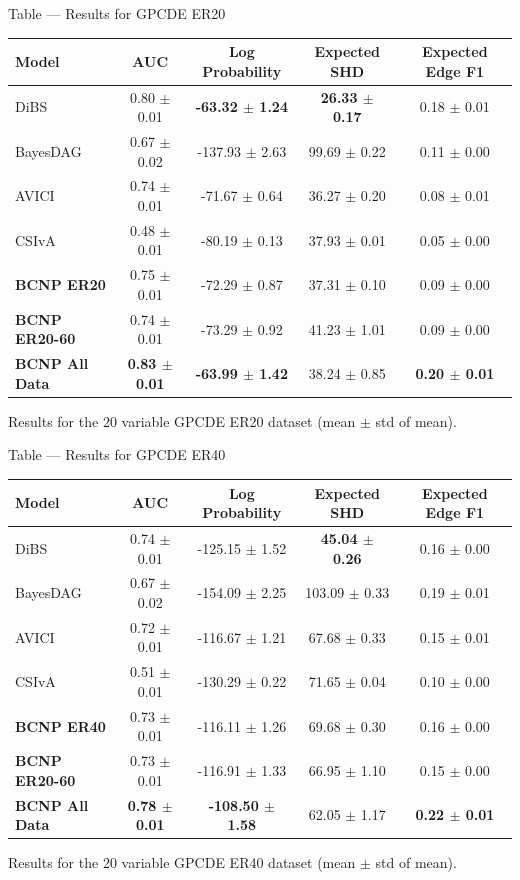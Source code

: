 \documentclass[aspectratio=169,10pt]{beamer}
\begin{document}
\begin{frame}{Table --- Results for GPCDE ER20}
\centering
\scriptsize
\begin{tabular}{lcccc}
\toprule
\textbf{Model} & \textbf{AUC} & \textbf{Log Probability} & \textbf{Expected SHD} & \textbf{Expected Edge F1} \\
\midrule
DiBS & 0.80 $\pm$ 0.01 & \textbf{-63.32 $\pm$ 1.24} & \textbf{26.33 $\pm$ 0.17} & 0.18 $\pm$ 0.01 \\
BayesDAG & 0.67 $\pm$ 0.02 & -137.93 $\pm$ 2.63 & 99.69 $\pm$ 0.22 & 0.11 $\pm$ 0.00 \\
AVICI & 0.74 $\pm$ 0.01 & -71.67 $\pm$ 0.64 & 36.27 $\pm$ 0.20 & 0.08 $\pm$ 0.01 \\
CSIvA & 0.48 $\pm$ 0.01 & -80.19 $\pm$ 0.13 & 37.93 $\pm$ 0.01 & 0.05 $\pm$ 0.00 \\
\textbf{BCNP ER20} & 0.75 $\pm$ 0.01 & -72.29 $\pm$ 0.87 & 37.31 $\pm$ 0.10 & 0.09 $\pm$ 0.00 \\
\textbf{BCNP ER20-60} & 0.74 $\pm$ 0.01 & -73.29 $\pm$ 0.92 & 41.23 $\pm$ 1.01 & 0.09 $\pm$ 0.00 \\
\textbf{BCNP All Data} & \textbf{0.83 $\pm$ 0.01} & \textbf{-63.99 $\pm$ 1.42} & 38.24 $\pm$ 0.85 & \textbf{0.20 $\pm$ 0.01} \\
\bottomrule
\end{tabular}

\vspace{0.3cm}
{\footnotesize Results for the 20 variable GPCDE ER20 dataset (mean $\pm$ std of mean).}
\end{frame}

\begin{frame}{Table --- Results for GPCDE ER40}
\centering
\scriptsize
\begin{tabular}{lcccc}
\toprule
\textbf{Model} & \textbf{AUC} & \textbf{Log Probability} & \textbf{Expected SHD} & \textbf{Expected Edge F1} \\
\midrule
DiBS & 0.74 $\pm$ 0.01 & -125.15 $\pm$ 1.52 & \textbf{45.04 $\pm$ 0.26} & 0.16 $\pm$ 0.00 \\
BayesDAG & 0.67 $\pm$ 0.02 & -154.09 $\pm$ 2.25 & 103.09 $\pm$ 0.33 & 0.19 $\pm$ 0.01 \\
AVICI & 0.72 $\pm$ 0.01 & -116.67 $\pm$ 1.21 & 67.68 $\pm$ 0.33 & 0.15 $\pm$ 0.01 \\
CSIvA & 0.51 $\pm$ 0.01 & -130.29 $\pm$ 0.22 & 71.65 $\pm$ 0.04 & 0.10 $\pm$ 0.00 \\
\textbf{BCNP ER40} & 0.73 $\pm$ 0.01 & -116.11 $\pm$ 1.26 & 69.68 $\pm$ 0.30 & 0.16 $\pm$ 0.00 \\
\textbf{BCNP ER20-60} & 0.73 $\pm$ 0.01 & -116.91 $\pm$ 1.33 & 66.95 $\pm$ 1.10 & 0.15 $\pm$ 0.00 \\
\textbf{BCNP All Data} & \textbf{0.78 $\pm$ 0.01} & \textbf{-108.50 $\pm$ 1.58} & 62.05 $\pm$ 1.17 & \textbf{0.22 $\pm$ 0.01} \\
\bottomrule
\end{tabular}

\vspace{0.3cm}
{\footnotesize Results for the 20 variable GPCDE ER40 dataset (mean $\pm$ std of mean).}
\end{frame}
\end{document}
